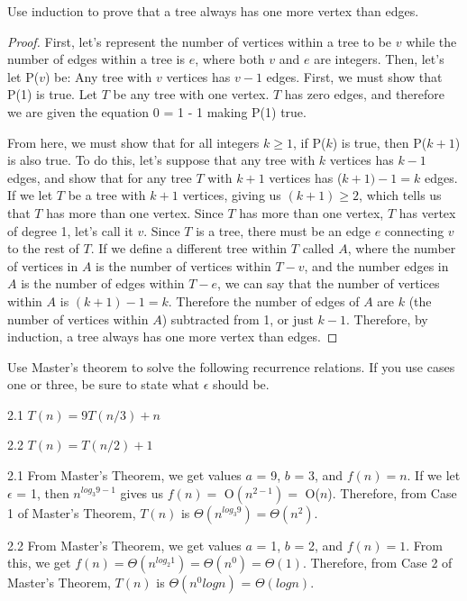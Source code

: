 \documentclass{article}
\author{Joshua Harthan}
\begin{document}
Use induction to prove that a tree always has one more vertex than edges.
\item[] 
    \begin{proof}
        \caption{}
         First, let's represent the number of vertices within a tree to be $v$ while the number of edges within a tree is $e$, where both $v$ and $e$ are integers. Then, let's let P($v$) be: Any tree with $v$ vertices has $v - 1$ edges. First, we must show that P(1) is true. Let $T$ be any tree with one vertex. $T$ has zero edges, and therefore we are given the equation 0 = 1 - 1 making P(1) true. 
        \item[] From here, we must show that for all integers $k \geq 1$, if P($k$) is true, then P($k+1$) is also true. To do this, let's suppose that any tree with $k$ vertices has $k - 1$ edges, and show that for any tree $T$ with $k + 1$ vertices has ($k + 1) - 1 = k$ edges. If we let $T$ be a tree with $k + 1$ vertices, giving us $(k + 1) \geq 2$, which tells us that $T$ has more than one vertex. Since $T$ has more than one vertex, $T$ has vertex of degree 1, let's call it $v$. Since $T$ is a tree, there must be an edge $e$ connecting $v$ to the rest of $T$. If we define a different tree within $T$ called $A$, where the number of vertices in $A$ is the number of vertices within $T - v$, and the number edges in $A$ is the number of edges within $T - e$, we can say that the number of vertices within $A$ is $(k + 1) - 1 = k$. Therefore the number of edges of $A$ are $k$ (the number of vertices within $A$) subtracted from 1, or just $k - 1$. Therefore, by induction, a tree always has one more vertex than edges.
        \end{proof}


\clearpage
\header
Use Master's theorem to solve the following recurrence relations. If you use cases one or three, be sure to state what $\epsilon$ should be.
\item[]2.1 $T(n) = 9 T(n/3) + n$
\item[]2.2 $T(n) = T(n/2) + 1$
\item[]2.1 From Master's Theorem, we get values $a$ = 9, $b$ = 3, and $f(n) = n$. If we let $\epsilon$ = 1, then $n^{log_{3}9 - 1}$ gives us $f(n) = $ O$(n^{2-1}) = $ O($n$). Therefore, from Case 1 of Master's Theorem, $T(n)$ is $\Theta(n^{log_{3}9}) = \Theta(n^{2})$.
\item[]2.2 From Master's Theorem, we get values $a$ = 1, $b$ = 2, and $f(n) = 1$. From this, we get $f(n) = \Theta(n^{log_{2}1}) = \Theta(n^{0}) = \Theta(1)$. Therefore, from Case 2 of Master's Theorem, $T(n)$ is $\Theta(n^{0}logn)$ = $\Theta(logn)$. 
\end{document}

